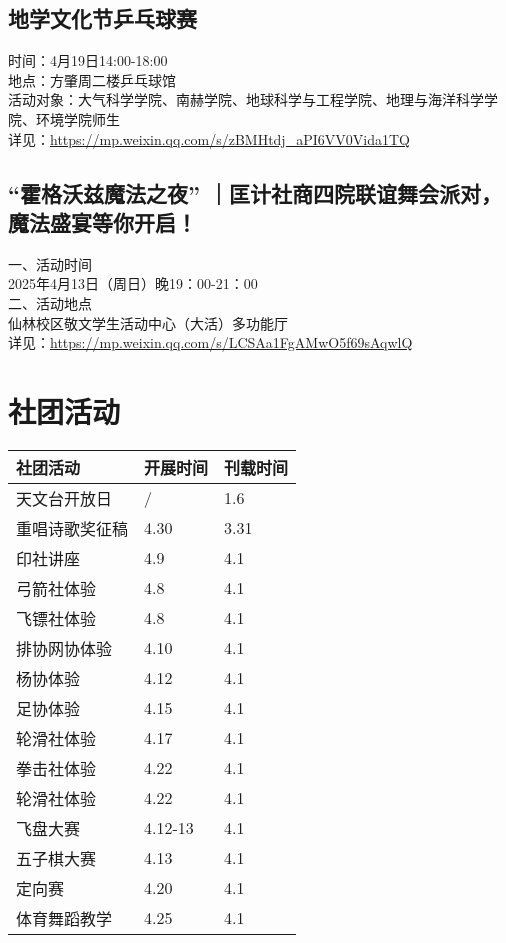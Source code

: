 \documentclass[letterpaper, 12pt]{article}
\begin{document}
\begin{multicols}{2}
\subsection{地学文化节乒乓球赛}
时间：4月19日14:00-18:00
\\地点：方肇周二楼乒乓球馆
\\活动对象：大气科学学院、南赫学院、地球科学与工程学院、地理与海洋科学学院、环境学院师生
\\详见：\url{https://mp.weixin.qq.com/s/zBMHtdj_aPI6VV0Vida1TQ}

\subsection{“霍格沃兹魔法之夜” ｜匡计社商四院联谊舞会派对，魔法盛宴等你开启！}
一、活动时间
\\2025年4月13日（周日）晚19：00-21：00
\\二、活动地点
\\仙林校区敬文学生活动中心（大活）多功能厅
\\详见：\url{https://mp.weixin.qq.com/s/LCSAa1FgAMwO5f69sAqwlQ}
\section{社团活动}
\begin{tabular}{|>{\centering\arraybackslash}m{}|m{}|m{}|}
    \hline
    社团活动 & 开展时间 & 刊载时间\\
    \hline\hline
    天文台开放日 & / & 1.6\\
    重唱诗歌奖征稿 & 4.30 & 3.31\\
    印社讲座 & 4.9 & 4.1\\
    弓箭社体验 & 4.8 & 4.1\\
    飞镖社体验 & 4.8 & 4.1\\
    排协网协体验 & 4.10 & 4.1\\
    杨协体验 & 4.12 & 4.1\\
    足协体验 & 4.15 & 4.1\\
    轮滑社体验 & 4.17 & 4.1\\
    拳击社体验 & 4.22 & 4.1\\
    轮滑社体验 & 4.22 & 4.1\\
    飞盘大赛 & 4.12-13 & 4.1\\
    五子棋大赛 & 4.13 & 4.1\\
    定向赛 & 4.20 & 4.1\\
    体育舞蹈教学 & 4.25 & 4.1\\
    

\end{tabular}
\end{multicols}
\end{document}
